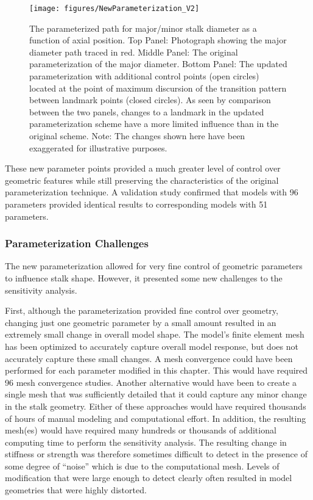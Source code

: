 \begin{figure}[htbp]
	\centering
	\texttt{[image: figures/NewParameterization\_V2]}
	\caption[The parameterized path for major/minor stalk diameter as a function of axial position.]{The parameterized path for major/minor stalk diameter as a function of axial position. Top  Panel: Photograph showing the major diameter path traced in red. Middle Panel: The original parameterization of the major diameter. Bottom Panel: The updated parameterization with additional control points (open circles) located at the point of maximum discursion of the transition pattern between landmark points (closed circles). As seen by comparison between the two panels, changes to a landmark in the updated parameterization scheme have a more limited influence than in the original scheme. Note: The changes shown here have been exaggerated for illustrative purposes. }
	\label{fig:NewParameterization_V2}
\end{figure}

These new parameter points provided a much greater level of control over geometric features while still preserving the characteristics of the original parameterization technique. A validation study confirmed that models with 96 parameters provided identical results to corresponding models with 51 parameters.

\subsubsection{Parameterization Challenges}
\label{sssec:parameterization_challenges}
The new parameterization allowed for very fine control of geometric parameters to influence stalk shape. However, it presented some new challenges to the sensitivity analysis. 

First, although the parameterization provided fine control over geometry, changing just one geometric parameter by a small amount resulted in an extremely small change in overall model shape. The model’s finite element mesh has been optimized to accurately capture overall model response, but does not accurately capture these small changes. A mesh convergence could have been performed for each parameter modified in this chapter. This would have required 96 mesh convergence studies. Another alternative would have been to create a single mesh that was sufficiently detailed that it could capture any minor change in the stalk geometry. Either of these approaches would have required thousands of hours of manual modeling and computational effort. In addition, the resulting mesh(es) would have required many hundreds or thousands of additional computing time to perform the sensitivity analysis. The resulting change in stiffness or strength was therefore sometimes difficult to detect in the presence of some degree of “noise” which is due to the computational mesh. Levels of modification that were large enough to detect clearly often resulted in model geometries that were highly distorted.

